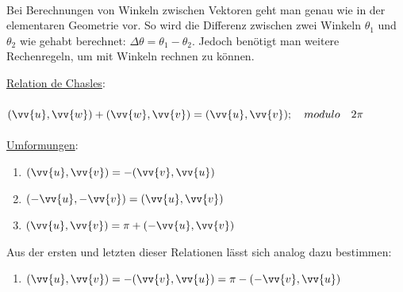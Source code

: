         \paragraph{} Bei Berechnungen von Winkeln zwischen Vektoren geht man genau wie in der elementaren Geometrie vor.
         So wird die Differenz zwischen zwei Winkeln $\theta_{1}$ und $\theta_{2}$ wie gehabt berechnet: $\Delta\theta = \theta_{1} - \theta_{2}$.
         Jedoch benötigt man weitere Rechenregeln, um mit Winkeln rechnen zu können.
        \\
        \begin{Theorem}
            \underline{Relation de Chasles}: \\\\
            $(\vv{u},\vv{w})+(\vv{w},\vv{v})=(\vv{u},\vv{v});\quad modulo\quad 2\pi$ \\\\
            \underline{Umformungen}: \\
            \begin{enumerate}[(1)]
                \item $(\vv{u},\vv{v})=-(\vv{v},\vv{u})\quad$
                \item $(-\vv{u},-\vv{v})=(\vv{u},\vv{v})\quad$
                \item $(\vv{u},\vv{v})=\pi+(-\vv{u},\vv{v})\quad$
            \end{enumerate}
                Aus der ersten und letzten dieser Relationen lässt sich analog dazu bestimmen:
            \begin{enumerate}[(4)]
                \item $(\vv{u},\vv{v})=-(\vv{v},\vv{u})=\pi-(-\vv{v},\vv{u})\quad$
            \end{enumerate}
        \end{Theorem}

        \\
        \\
        \\

